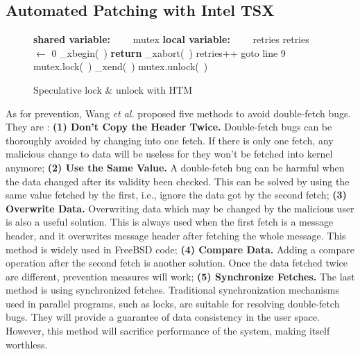\documentclass[10pt]{llncs}
\begin{document}
\subsection{Automated Patching with Intel TSX}
\label{design2}

\begin{figure}[htb!]
\begin{algorithmic}[1]
\State \textbf{shared variable:} 
\State ~~~~mutex
\State 
\State \textbf{local variable:} 
\State ~~~~retries
\State
{}
  \State retries $\gets$ 0
  \State \_xbegin(~)  \label{line:xbegin}
  \State \textbf{return}
  \Else 
  \State \_xabort(~)
  \EndIf
  \State retries++
  \State goto line 9
  \Else
  \State mutex.lock(~) 
  \EndIf
\EndProcedure
\State
{}
\State \_xend(~)
\Else 
\State mutex.unlock(~)
\EndIf
\EndProcedure
\end{algorithmic}
\caption{Speculative lock \& unlock with HTM }
\label{speculative-lock}
\end{figure}




As for prevention, Wang \textit{et al.} proposed five methods to avoid double-fetch bugs. They are : 
\textbf{(1) Don't Copy the Header Twice.} 
Double-fetch bugs can be thoroughly avoided by changing into one fetch. If there is only one fetch, any malicious change to data will be useless for they won't be fetched into kernel anymore; 
\textbf{(2) Use the Same Value.} 
A double-fetch bug can be harmful when the data changed after its validity been checked. This can be solved by using the same value fetched by the first, i.e., ignore the data got by the second fetch; 
\textbf{(3) Overwrite Data.} 
Overwriting data which may be changed by the malicious user is also a useful solution. This is always used when the first fetch is a message header, and it overwrites message header after fetching the whole message. This method is widely used in FreeBSD code; 
\textbf{(4) Compare Data.} 
Adding a compare operation after the second fetch is another solution. Once the data fetched twice are different, prevention measures will work; 
\textbf{(5) Synchronize Fetches.} 
The last method is using synchronized fetches. Traditional synchronization mechanisms used in parallel programs, such as locks, are suitable for resolving double-fetch bugs. They will provide a guarantee of data consistency in the user space. However, this method will sacrifice performance of the system, making itself worthless.
\end{document}
